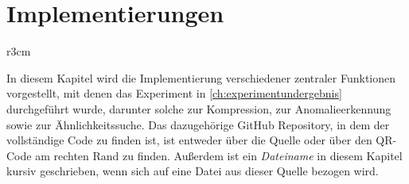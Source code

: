 \chapter{Implementierungen}
\begin{wrapfigure}{r}{3cm}
    \centering
\end{wrapfigure}

In diesem Kapitel wird die Implementierung verschiedener zentraler Funktionen vorgestellt, mit denen das Experiment in \autoref{ch:experimentundergebnis} durchgeführt wurde, darunter solche zur Kompression, zur Anomalieerkennung sowie zur Ähnlichkeitssuche. Das dazugehörige GitHub Repository, in dem der vollständige Code zu finden ist, ist entweder über die Quelle \cite{meinGithubCode} oder über den QR-Code am rechten Rand zu finden. Außerdem ist ein \textit{Dateiname} in diesem Kapitel kursiv geschrieben, wenn sich auf eine Datei aus dieser Quelle bezogen wird. 




